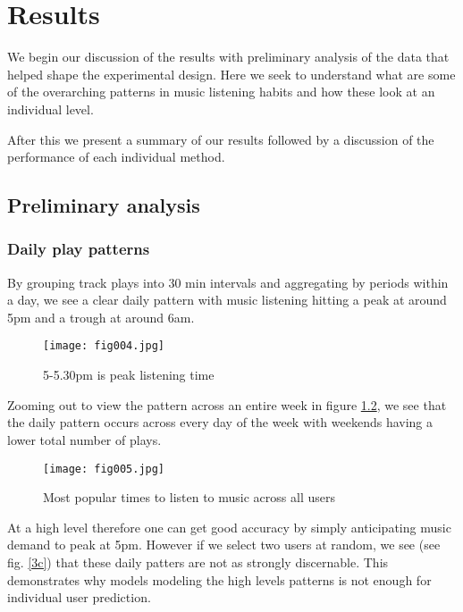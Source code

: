 
\chapter{Results}

\label{Chapter4}

We begin our discussion of the results with preliminary analysis of the data that helped shape the experimental design. Here we seek to understand what are some of the overarching patterns in music listening habits and how these look at an individual level.

After this we present a summary of our results followed by a discussion of the performance of each individual method.

\section{Preliminary analysis}

\subsection{Daily play patterns}

By grouping track plays into 30 min intervals and aggregating by periods within a day, we see a clear daily pattern with music listening hitting a peak at around 5pm and a trough at around 6am.

\begin{figure}[h!]
	\centering
	\texttt{[image: fig004.jpg]}
	\caption{5-5.30pm is peak listening time}
	\label{3a}
\end{figure} 

Zooming out to view the pattern across an entire week in figure \ref{3b}, we see that the daily pattern occurs across every day of the week with weekends having a lower total number of plays.

\begin{figure}[h!]
	\centering
	\texttt{[image: fig005.jpg]}
	\caption{Most popular times to listen to music across all users}
	\label{3b}
\end{figure} 

At a high level therefore one can get good accuracy by simply anticipating music demand to peak at 5pm. However if we select two users at random, we see (see fig. \ref{3c}) that these daily patters are not as strongly discernable. This demonstrates why models modeling the high levels patterns is not enough for individual user prediction. 

